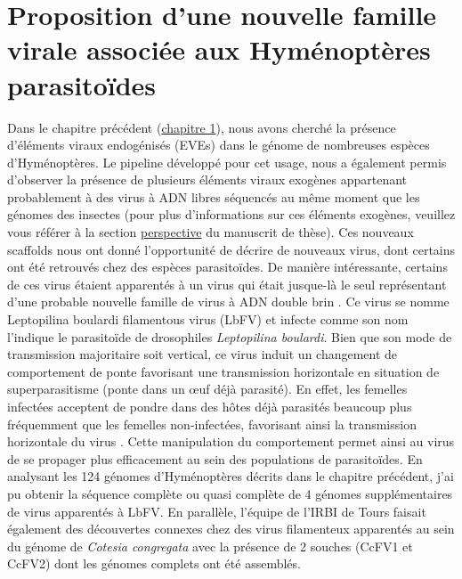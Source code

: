 \chapter{Proposition d'une nouvelle famille virale associée aux Hyménoptères parasitoïdes}

Dans le chapitre précédent (\hyperref[sec:chap1]{chapitre 1}), nous avons cherché la présence d'éléments viraux endogénisés (EVEs) dans le génome de nombreuses espèces d'Hyménoptères. Le pipeline développé pour cet usage, nous a également permis d'observer la présence de plusieurs éléments viraux exogènes appartenant probablement à des virus à ADN libres séquencés au même moment que les génomes des insectes (pour plus d'informations sur ces éléments exogènes, veuillez vous référer à la section \hyperref[sec:perspective]{perspective} du manuscrit de thèse). Ces nouveaux scaffolds nous ont donné l'opportunité de décrire de nouveaux virus, dont certains ont été retrouvés chez des espèces parasitoïdes. De manière intéressante, certains de ces virus étaient apparentés à un virus qui était jusque-là le seul représentant d'une probable nouvelle famille de virus à ADN double brin \citep{lepetit_genome_2017}. Ce virus se nomme Leptopilina boulardi filamentous virus (LbFV) et infecte comme son nom l'indique le parasitoïde de drosophiles \textit{Leptopilina boulardi}. Bien que son mode de transmission majoritaire soit vertical, ce virus induit un changement de comportement de ponte favorisant une transmission horizontale en situation de superparasitisme (ponte dans un œuf déjà parasité). En effet, les femelles infectées acceptent de pondre dans des hôtes déjà parasités beaucoup plus fréquemment que les femelles non-infectées, favorisant ainsi la transmission horizontale du virus \citep{varaldi_infectious_2003}. Cette manipulation du comportement permet ainsi au virus de se propager plus efficacement au sein des populations de parasitoïdes. En analysant les 124 génomes d'Hyménoptères décrits dans le chapitre précédent, j'ai pu obtenir la séquence complète ou quasi complète de 4 génomes supplémentaires de virus apparentés à LbFV. En parallèle, l’équipe de l’IRBI de Tours faisait également des découvertes connexes chez des virus filamenteux apparentés au sein du génome de \textit{Cotesia congregata} avec la présence de 2 souches (CcFV1 et CcFV2) dont les génomes complets ont été assemblés. \\

